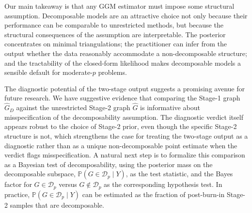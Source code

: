 Our main takeaway is that any GGM estimator must impose some structural assumption. Decomposable models are an attractive choice not only because their performance can be comparable to unrestricted methods, but because the structural consequences of the assumption are interpretable. The posterior concentrates on minimal triangulations; the practitioner can infer from the output whether the data reasonably accommodate a non-decomposable structure; and the tractability of the closed-form likelihood makes decomposable models a sensible default for moderate-$p$ problems.

The diagnostic potential of the two-stage output suggests a promising avenue for future research. We have suggestive evidence that comparing the Stage-1 graph $\hat G_D$ against the unrestricted Stage-2 graph $\hat G$ is informative about misspecification of the decomposability assumption. The diagnostic verdict itself appears robust to the choice of Stage-2 prior, even though the specific Stage-2 structure is not, which strengthens the case for treating the two-stage output as a diagnostic rather than as a unique non-decomposable point estimate when the verdict flags misspecification. A natural next step is to formalize this comparison as a Bayesian test of decomposability, using the posterior mass on the decomposable subspace, $\mathbb{P}(G \in \mathcal{D}_p \mid Y)$, as the test statistic, and the Bayes factor for $G \in \mathcal{D}_p$ versus $G \notin \mathcal{D}_p$ as the corresponding hypothesis test. In practice, $\mathbb{P}(G \in \mathcal{D}_p \mid Y)$ can be estimated as the fraction of post-burn-in Stage-2 samples that are decomposable.
